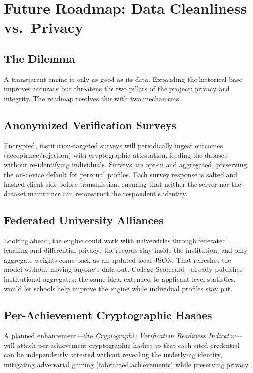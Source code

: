 \documentclass[conference]{IEEEtran}
\begin{document}
\section{Future Roadmap: Data Cleanliness vs.\ Privacy}
\label{sec:roadmap}
\subsection{The Dilemma}
A transparent engine is only as good as its data. Expanding the historical base improves accuracy but threatens the two pillars of the project: privacy and integrity. The roadmap resolves this with two mechanisms.

\subsection{Anonymized Verification Surveys}
Encrypted, institution-targeted surveys will periodically ingest outcomes (acceptance/rejection) with cryptographic attestation, feeding the dataset without re-identifying individuals. Surveys are opt-in and aggregated, preserving the on-device default for personal profiles. Each survey response is salted and hashed client-side before transmission, ensuring that neither the server nor the dataset maintainer can reconstruct the respondent's identity.

\subsection{Federated University Alliances}
Looking ahead, the engine could work with universities through federated learning and differential privacy: the records stay inside the institution, and only aggregate weights come back as an updated local JSON. That refreshes the model without moving anyone's data out. College Scorecard~\cite{scorecard} already publishes institutional aggregates; the same idea, extended to applicant-level statistics, would let schools help improve the engine while individual profiles stay put.

\subsection{Per-Achievement Cryptographic Hashes}
A planned enhancement---the \textit{Cryptographic Verification Readiness Indicator}---will attach per-achievement cryptographic hashes so that each cited credential can be independently attested without revealing the underlying identity, mitigating adversarial gaming (fabricated achievements) while preserving privacy.
\end{document}
